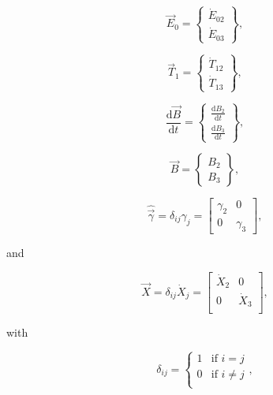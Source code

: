 \begin{equation} \label{eq:E_vec_def}
	\vec{E}_{0} 
	=
	\begin{Bmatrix}
		\dot{E}_{02} \\
		\dot{E}_{03}
	\end{Bmatrix},
\end{equation}

\begin{equation} \label{eq:T_vec_def}
	\vec{T}_{1} 
	=
	\begin{Bmatrix}
		\dot{T}_{12} \\
		\dot{T}_{13}
	\end{Bmatrix},
\end{equation}

\begin{equation} \label{eq:dBdt_vec_def}
	\frac{\mathrm{d}\vec{B}}{\mathrm{d}t} 
	=
	\begin{Bmatrix}	
		\frac{\mathrm{d}B_{2}}{\mathrm{d}t}	\\[0.4em] %
		\frac{\mathrm{d}B_{3}}{\mathrm{d}t}
	\end{Bmatrix},
\end{equation}

\begin{equation} \label{eq:B_vec_def}
	\vec{B} 
	=
	\begin{Bmatrix}	
		B_{2} \\
		B_{3}
	\end{Bmatrix},
\end{equation}

\begin{equation}
	\hat{\vec{\gamma}}
	=
	\delta_{ij} \gamma_{j}
	=
	\begin{bmatrix}
		\gamma_{2} & 0         \\
		0          & \gamma_{3}
	\end{bmatrix},
\end{equation}

\noindent{}and

\begin{equation} \label{eq:X_hat_matrix_def}
	\hat{\vec{X}} 
	= 
	\delta_{ij} \dot{X}_{j} 
	= 
	\begin{bmatrix}
		\dot{X}_{2}		&	0	  \\
		0				&	\dot{X}_{3}	\\
	\end{bmatrix},
\end{equation}

\noindent{}with

\begin{equation}\label{eq:k_delta}
	\delta_{ij} 
	= 
	\begin{cases}	
		1 	& 	\text{if  } i = j		\\
		0	&	\text{if  } i \neq j	\\
	\end{cases},
\end{equation}

